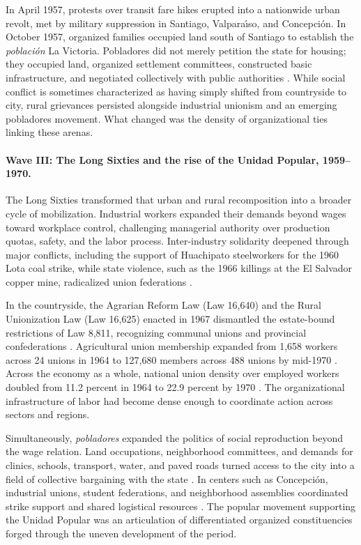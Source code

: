 In April 1957, protests over transit fare hikes erupted into a nationwide urban revolt, met by military suppression in Santiago, Valpara\'{\i}so, and Concepci\'on. In October 1957, organized families occupied land south of Santiago to establish the \emph{poblaci\'on} La Victoria. Pobladores did not merely petition the state for housing; they occupied land, organized settlement committees, constructed basic infrastructure, and negotiated collectively with public authorities \citep{Garces2002,Murphy2015}. While social conflict is sometimes characterized as having simply shifted from countryside to city, rural grievances persisted alongside industrial unionism and an emerging pobladores movement. What changed was the density of organizational ties linking these arenas.

\paragraph{Wave III: The Long Sixties and the rise of the Unidad Popular, 1959--1970.}
The Long Sixties transformed that urban and rural recomposition into a broader cycle of mobilization. Industrial workers expanded their demands beyond wages toward workplace control, challenging managerial authority over production quotas, safety, and the labor process. Inter-industry solidarity deepened through major conflicts, including the support of Huachipato steelworkers for the 1960 Lota coal strike, while state violence, such as the 1966 killings at the El Salvador copper mine, radicalized union federations \citep{Thielemann2018}.

In the countryside, the Agrarian Reform Law (Law 16,640) and the Rural Unionization Law (Law 16,625) enacted in 1967 dismantled the estate-bound restrictions of Law 8,811, recognizing communal unions and provincial confederations \citep{Chile1967}. Agricultural union membership expanded from 1,658 workers across 24 unions in 1964 to 127,680 members across 488 unions by mid-1970 \citep{DeVylder1976}. Across the economy as a whole, national union density over employed workers doubled from 11.2 percent in 1964 to 22.9 percent by 1970 \citep{OsorioPolanco2021}. The organizational infrastructure of labor had become dense enough to coordinate action across sectors and regions.

Simultaneously, \emph{pobladores} expanded the politics of social reproduction beyond the wage relation. Land occupations, neighborhood committees, and demands for clinics, schools, transport, water, and paved roads turned access to the city into a field of collective bargaining with the state \citep{Garces2002,Murphy2015}. In centers such as Concepci\'on, industrial unions, student federations, and neighborhood assemblies coordinated strike support and shared logistical resources \citep{Schlotterbeck2018}. The popular movement supporting the Unidad Popular was an articulation of differentiated organized constituencies forged through the uneven development of the period.

